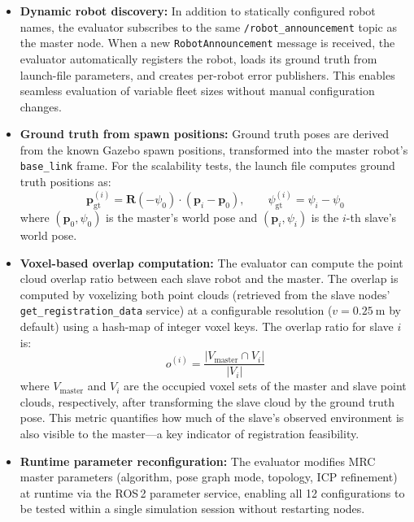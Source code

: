 \begin{itemize}
    \item \textbf{Dynamic robot discovery:}
          In addition to statically configured robot names, the evaluator
          subscribes to the same \texttt{/robot\_announcement} topic as
          the master node.
          When a new \texttt{RobotAnnouncement} message is received,
          the evaluator automatically registers the robot, loads its
          ground truth from launch-file parameters, and creates per-robot
          error publishers.
          This enables seamless evaluation of variable fleet sizes without
          manual configuration changes.

    \item \textbf{Ground truth from spawn positions:}
          Ground truth poses are derived from the known Gazebo spawn
          positions, transformed into the master robot's
          \texttt{base\_link} frame.
          For the scalability tests, the launch file computes ground
          truth positions as:
          \begin{equation}
              \mathbf{p}_\mathrm{gt}^{(i)} = \mathbf{R}(-\psi_0)
              \cdot (\mathbf{p}_i - \mathbf{p}_0), \qquad
              \psi_\mathrm{gt}^{(i)} = \psi_i - \psi_0
          \end{equation}
          where $(\mathbf{p}_0, \psi_0)$ is the master's world pose
          and $(\mathbf{p}_i, \psi_i)$ is the $i$-th slave's world pose.

    \item \textbf{Voxel-based overlap computation:}
          The evaluator can compute the point cloud overlap ratio between
          each slave robot and the master.
          The overlap is computed by voxelizing both point clouds
          (retrieved from the slave nodes' \texttt{get\_registration\_data}
          service) at a configurable resolution
          ($v = \SI{0.25}{\metre}$ by default) using a hash-map of
          integer voxel keys.
          The overlap ratio for slave $i$ is:
          \begin{equation}
              o^{(i)} = \frac{|V_\mathrm{master} \cap V_i|}{|V_i|}
          \end{equation}
          where $V_\mathrm{master}$ and $V_i$ are the occupied voxel
          sets of the master and slave point clouds, respectively,
          after transforming the slave cloud by the ground truth pose.
          This metric quantifies how much of the slave's observed
          environment is also visible to the master---a key indicator
          of registration feasibility.

    \item \textbf{Runtime parameter reconfiguration:}
          The evaluator modifies MRC master parameters (algorithm,
          pose graph mode, topology, ICP refinement) at runtime via
          the ROS\,2 parameter service, enabling all 12 configurations
          to be tested within a single simulation session without
          restarting nodes.
\end{itemize}

